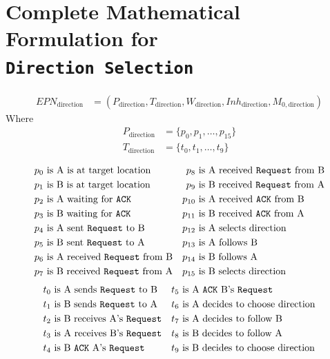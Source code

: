 \documentclass[12pt,a4paper]{article}
\begin{document}
\section{\texorpdfstring{Complete Mathematical Formulation for \\ \texttt{Direction Selection}}{Complete Mathematical Formulation for Direction Selection}}
\label{app:direction}

\begin{align*}
    EPN_{\text{direction}} &= (P_{\text{direction}}, T_{\text{direction}}, W_{\text{direction}}, Inh_{\text{direction}}, M_{0, \text{direction}})
\end{align*}
Where
\begin{align*}
    P_{\text{direction}} &= \{p_0, p_1, \ldots, p_{15}\} \\
    T_{\text{direction}} &= \{t_0, t_1, \ldots, t_{9}\} \\
\end{align*}
\begin{align*}
    p_0  &\text{ is A is at target location}              & p_{8} &\text{ is A received \texttt{Request} from B} \\
    p_1  &\text{ is B is at target location}              & p_{9} &\text{ is B received \texttt{Request} from A} \\
    p_2  &\text{ is A waiting for \texttt{ACK}}              & p_{10} &\text{ is A received \texttt{ACK} from B} \\
    p_3  &\text{ is B waiting for \texttt{ACK}}                     & p_{11} &\text{ is B received \texttt{ACK} from A} \\
    p_4  &\text{ is A sent \texttt{Request} to B}                     & p_{12} &\text{ is A selects direction} \\
    p_5  &\text{ is B sent \texttt{Request} to A}                     & p_{13} &\text{ is A follows B} \\
    p_6  &\text{ is A received \texttt{Request} from B}                     & p_{14} &\text{ is B follows A} \\
    p_7  &\text{ is B received \texttt{Request} from A}                     & p_{15} &\text{ is B selects direction} \\
\end{align*}
\begin{align*}
    t_0  &\text{ is A sends \texttt{Request} to B}              & t_{5} &\text{ is A \texttt{ACK} B's \texttt{Request}} \\
    t_1  &\text{ is B sends \texttt{Request} to A}              & t_{6} &\text{ is A decides to choose direction} \\
    t_2  &\text{ is B receives A's \texttt{Request}}              & t_{7} &\text{ is A decides to follow B} \\
    t_3  &\text{ is A receives B's \texttt{Request}}                & t_{8} &\text{ is B decides to follow A} \\
    t_4  &\text{ is B \texttt{ACK} A's \texttt{Request}}                     & t_{9} &\text{ is B decides to choose direction} \\
\end{align*}
\end{document}
